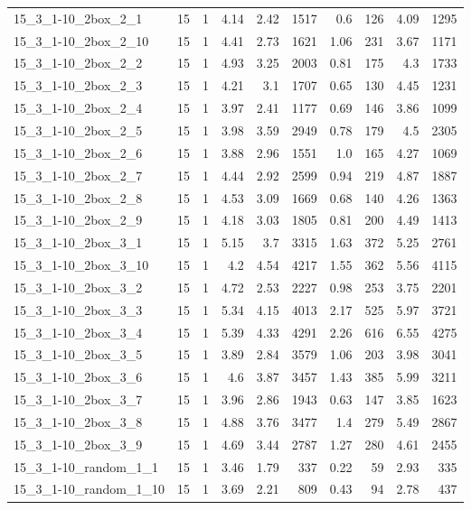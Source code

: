 \begin{center}
\begin{scriptsize}
\begin{longtable}{lrrrrrrrrr}
15\_3\_1-10\_2box\_2\_1 & 15 & 1 & 4.14 & 2.42 & 1517 & 0.6 & 126 & 4.09 & 1295\\
15\_3\_1-10\_2box\_2\_10 & 15 & 1 & 4.41 & 2.73 & 1621 & 1.06 & 231 & 3.67 & 1171\\
15\_3\_1-10\_2box\_2\_2 & 15 & 1 & 4.93 & 3.25 & 2003 & 0.81 & 175 & 4.3 & 1733\\
15\_3\_1-10\_2box\_2\_3 & 15 & 1 & 4.21 & 3.1 & 1707 & 0.65 & 130 & 4.45 & 1231\\
15\_3\_1-10\_2box\_2\_4 & 15 & 1 & 3.97 & 2.41 & 1177 & 0.69 & 146 & 3.86 & 1099\\
15\_3\_1-10\_2box\_2\_5 & 15 & 1 & 3.98 & 3.59 & 2949 & 0.78 & 179 & 4.5 & 2305\\
15\_3\_1-10\_2box\_2\_6 & 15 & 1 & 3.88 & 2.96 & 1551 & 1.0 & 165 & 4.27 & 1069\\
15\_3\_1-10\_2box\_2\_7 & 15 & 1 & 4.44 & 2.92 & 2599 & 0.94 & 219 & 4.87 & 1887\\
15\_3\_1-10\_2box\_2\_8 & 15 & 1 & 4.53 & 3.09 & 1669 & 0.68 & 140 & 4.26 & 1363\\
15\_3\_1-10\_2box\_2\_9 & 15 & 1 & 4.18 & 3.03 & 1805 & 0.81 & 200 & 4.49 & 1413\\
15\_3\_1-10\_2box\_3\_1 & 15 & 1 & 5.15 & 3.7 & 3315 & 1.63 & 372 & 5.25 & 2761\\
15\_3\_1-10\_2box\_3\_10 & 15 & 1 & 4.2 & 4.54 & 4217 & 1.55 & 362 & 5.56 & 4115\\
15\_3\_1-10\_2box\_3\_2 & 15 & 1 & 4.72 & 2.53 & 2227 & 0.98 & 253 & 3.75 & 2201\\
15\_3\_1-10\_2box\_3\_3 & 15 & 1 & 5.34 & 4.15 & 4013 & 2.17 & 525 & 5.97 & 3721\\
15\_3\_1-10\_2box\_3\_4 & 15 & 1 & 5.39 & 4.33 & 4291 & 2.26 & 616 & 6.55 & 4275\\
15\_3\_1-10\_2box\_3\_5 & 15 & 1 & 3.89 & 2.84 & 3579 & 1.06 & 203 & 3.98 & 3041\\
15\_3\_1-10\_2box\_3\_6 & 15 & 1 & 4.6 & 3.87 & 3457 & 1.43 & 385 & 5.99 & 3211\\
15\_3\_1-10\_2box\_3\_7 & 15 & 1 & 3.96 & 2.86 & 1943 & 0.63 & 147 & 3.85 & 1623\\
15\_3\_1-10\_2box\_3\_8 & 15 & 1 & 4.88 & 3.76 & 3477 & 1.4 & 279 & 5.49 & 2867\\
15\_3\_1-10\_2box\_3\_9 & 15 & 1 & 4.69 & 3.44 & 2787 & 1.27 & 280 & 4.61 & 2455\\
15\_3\_1-10\_random\_1\_1 & 15 & 1 & 3.46 & 1.79 & 337 & 0.22 & 59 & 2.93 & 335\\
15\_3\_1-10\_random\_1\_10 & 15 & 1 & 3.69 & 2.21 & 809 & 0.43 & 94 & 2.78 & 437\\

\end{longtable}
\end{scriptsize}
\end{center}
